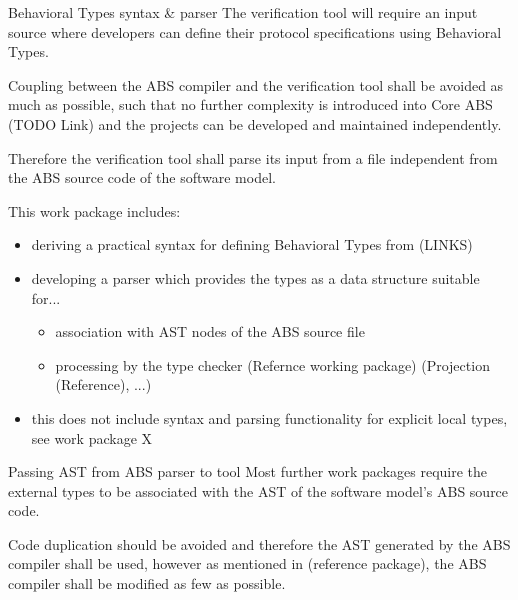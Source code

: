 \documentclass[paper=a4,nochapname,accentcolor=tud9c]{tudexercise}
\makeatletter
\def\namedlabel#1#2{\begingroup
    #1%
    \def\@currentlabel{\thedescriptcount}%
    \phantomsection\label{#2}\endgroup
}
\newcounter{descriptcount}
\renewcommand*\thedescriptcount{[\Alph{descriptcount}]}}
\renewcommand*\thedescriptcount{\roman{descriptcount}}}
\makeatother
\begin{document}
\begin{enumdescript}
\item[\namedlabel{Behavioral Types syntax \& parser}{WPsyntaxAndParser}]%
    The verification tool will require an input source where developers can
    define their protocol specifications using Behavioral Types.

    Coupling between the ABS compiler and the verification tool shall be avoided
    as much as possible, such that no further complexity is introduced into Core
    ABS (TODO Link) and the projects can be developed and maintained independently.
    
    Therefore the verification tool shall parse its input from a file independent
    from the ABS source code of the software model.

    This work package includes:
    \begin{itemize}
      \item deriving a practical syntax for defining Behavioral Types from (LINKS)
      \item developing a parser which provides the types as a data structure
        suitable for...
      \begin{itemize}
        \item association with AST nodes of the ABS source file
        \item processing by the type checker (Refernce working package) (Projection (Reference), ...)
      \end{itemize}
      \item this does not include syntax and parsing functionality for explicit
        local types, see work package X
    \end{itemize}
  \item[\namedlabel{Passing AST from ABS parser to tool}{WPPassAST}]%
    Most further work packages require the external types to be associated with
    the AST of the software model's ABS source code.

    Code duplication should be avoided and therefore the AST generated by the
    ABS compiler shall be used, however as mentioned in (reference package),
    the ABS compiler shall be modified as few as possible.


\end{enumdescript}
\end{document}
